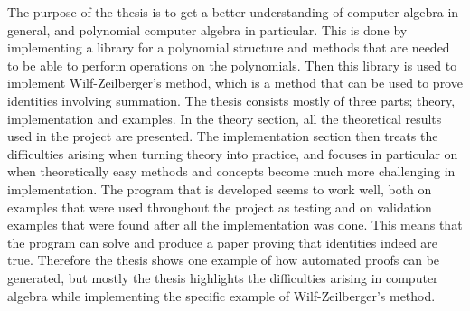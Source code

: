 The purpose of the thesis is to get a better understanding of computer algebra in general, and polynomial computer algebra in particular. This is done by implementing a library for a polynomial structure and methods that are needed to be able to perform operations on the polynomials. Then this library is used to implement Wilf-Zeilberger's method, which is a method that can be used to prove identities involving summation. The thesis consists mostly of three parts; theory, implementation and examples. In the theory section, all the theoretical results used in the project are presented. The implementation section then treats the difficulties arising when turning theory into practice, and focuses in particular on when theoretically easy methods and concepts become much more challenging in implementation. The program that is developed seems to work well, both on examples that were used throughout the project as testing and on validation examples that were found after all the implementation was done. This means that the program can solve and produce a paper proving that identities indeed are true. Therefore the thesis shows one example of how automated proofs can be generated, but mostly the thesis highlights the difficulties arising in computer algebra while implementing the specific example of Wilf-Zeilberger's method.
